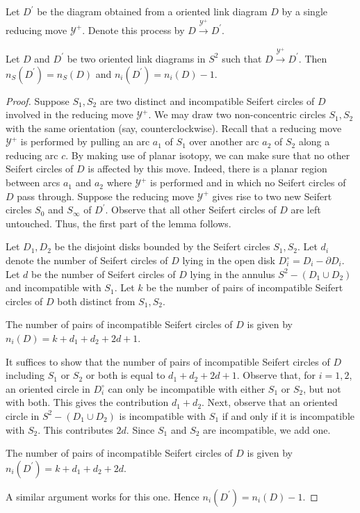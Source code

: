 Let $D^{\prime}$ be the diagram obtained from a oriented link diagram $D$ by a single reducing move $\mathcal{Y}^+$. Denote this process by $D \xrightarrow{\mathcal{Y}^+} D^{\prime}$. 

\begin{lemma}
\label{l1}
Let $D$ and $D^{\prime}$ be two oriented link diagrams in $S^2$ such that $D \xrightarrow{\mathcal{Y}^+} D^{\prime}$. Then $n_S(D^{\prime}) = n_S(D)$ and $n_{i}(D^{\prime}) = n_{i}(D) - 1$.
\end{lemma}

\begin{proof}
  Suppose $S_1, S_2$ are two distinct and incompatible Seifert circles of $D$ involved in the reducing move $\mathcal{Y}^{+}$. We may draw two non-concentric circles $S_1, S_2$ with the same orientation (say, counterclockwise). Recall that a reducing move $\mathcal{Y}^+$ is performed by pulling an arc $a_1$ of $S_1$ over another arc $a_2$ of $S_2$ along a reducing arc $c$. By making use of planar isotopy, we can make sure that no other Seifert circles of $D$ is affected by this move. Indeed, there is a planar region between arcs $a_1$ and $a_2$ where $\mathcal{Y}^+$ is performed and in which no Seifert circles of $D$ pass through. Suppose the reducing move $\mathcal{Y}^{+}$ gives rise to two new Seifert circles $S_0$ and $S_{\infty}$ of $D^{\prime}$. Observe that all other Seifert circles of $D$ are left untouched. Thus, the first part of the lemma follows.
  
Let $D_1, D_2$ be the disjoint disks bounded by the Seifert circles $S_1, S_2$. Let $d_i$ denote the number of Seifert circles of $D$ lying in the open disk $D_i^{\circ} = D_i - \partial D_i$. Let $d$ be the number of Seifert circles of $D$ lying in the annulus $S^2 - (D_1 \cup D_2)$ and incompatible with $S_1$. Let $k$ be the number of pairs of incompatible Seifert circles of $D$ both distinct from $S_1, S_2$.

\begin{claim}
  The number of pairs of incompatible Seifert circles of $D$ is given by $n_{i}(D) = k + d_1 + d_2 + 2d + 1$.
\end{claim}

It suffices to show that the number of pairs of incompatible Seifert circles of $D$ including $S_1$ or $S_2$ or both is equal to $d_1 + d_2 + 2d + 1$. Observe that, for $i = 1, 2$, an oriented circle in $D_i^{\circ}$ can only be incompatible with either $S_1$ or $S_2$, but not with both. This gives the contribution $d_1 + d_2$. Next, observe that an oriented circle in $S^2 - (D_1 \cup D_2)$ is incompatible with $S_1$ if and only if it is incompatible with $S_2$. This contributes $2d$. Since $S_1$ and $S_2$ are incompatible, we add one.

\begin{claim}
  The number of pairs of incompatible Seifert circles of $D$ is given by $n_i(D^{\prime}) = k + d_1 + d_2 + 2d$.
\end{claim}

A similar argument works for this one. Hence $n_i(D^{\prime}) = n_i(D) - 1$.
\end{proof}

